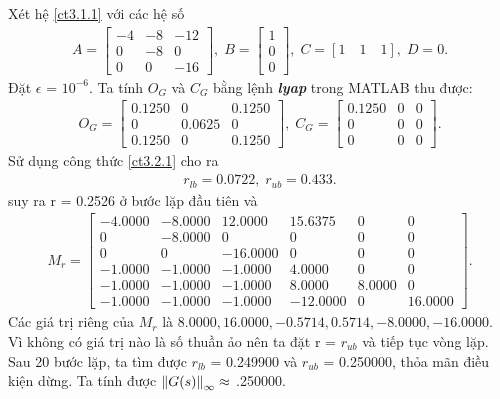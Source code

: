 \newline
\begin{example}
Xét hệ \eqref{ct3.1.1} với các hệ số
\begin{align*}
    A = \begin{bmatrix}
        -4 & -8 & -12\\
        0 & -8 & 0\\
        0 & 0 & -16
    \end{bmatrix}, \; B = 
    \begin{bmatrix}
        1\\0\\0
    \end{bmatrix}, \; C = [1 \quad 1 \quad 1],\; D = 0.
\end{align*}
Đặt $\epsilon$ = $10^{-6}$. \newline
Ta tính $O_G$ và $C_G$ bằng lệnh \textbf{\emph{lyap}} trong MATLAB thu được:
\begin{align*}
    O_G = 
    \begin{bmatrix}
        0.1250 & 0 & 0.1250\\
        0 & 0.0625 & 0\\
        0.1250 & 0 & 0.1250
    \end{bmatrix}, \; C_G = 
\begin{bmatrix}
    0.1250 & 0 & 0\\
    0 & 0 & 0\\
    0 & 0 & 0
\end{bmatrix}.
\end{align*}
Sử dụng công thức \eqref{ct3.2.1} cho ra \begin{align}
    r_{lb} = 0.0722, \; r_{ub} = 0.433.\nonumber
\end{align}
suy ra r = 0.2526 ở bước lặp đầu tiên và
\begin{align*}
M_r = 
\begin{bmatrix}
    -4.0000 & -8.0000 & 12.0000 & 15.6375 & 0 & 0\\
    0 & -8.0000 & 0 & 0 & 0 & 0\\
    0 & 0 & -16.0000 & 0 & 0 & 0\\
    -1.0000 & -1.0000 & -1.0000 & 4.0000 & 0 & 0\\
    -1.0000 & -1.0000 & -1.0000 & 8.0000 & 8.0000 & 0\\
    -1.0000 & -1.0000 & -1.0000 & -12.0000 & 0 & 16.0000
\end{bmatrix}.
\end{align*}
Các giá trị riêng của $M_r$ là ${8.0000, 16.0000, -0.5714, 0.5714, -8.0000, -16.0000}$. Vì không có giá trị nào là số thuần ảo nên ta đặt r = $r_{ub}$ và tiếp tục vòng lặp. 
\newline
Sau 20 bước lặp, ta tìm được $r_{lb}$ = 0.249900 và $r_{ub}$ = 0.250000, thỏa mãn điều kiện dừng. Ta tính được $\norm{G(s)}_\infty \approx $ .250000. 
\end{example}
\newpage

